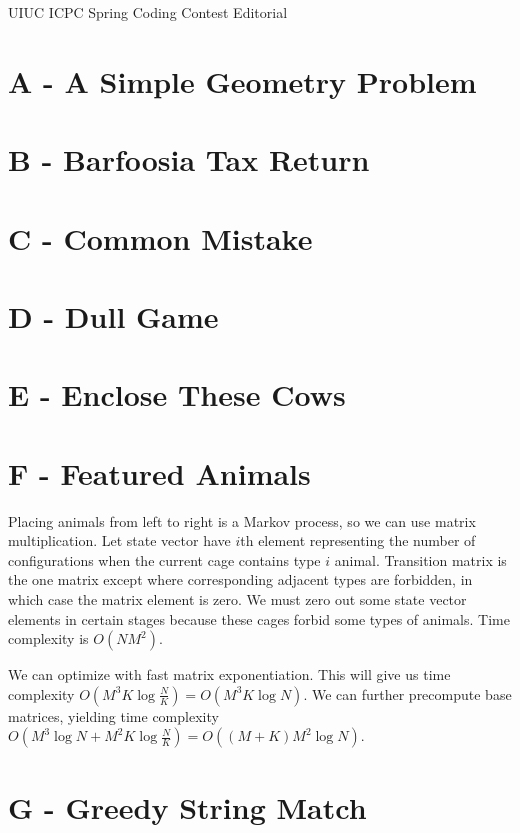\documentclass{article}
\begin{document}
UIUC ICPC Spring Coding Contest Editorial

\section{A - A Simple Geometry Problem}



\section{B - Barfoosia Tax Return}



\section{C - Common Mistake}



\section{D - Dull Game}



\section{E - Enclose These Cows}



\section{F - Featured Animals}

Placing animals from left to right is a Markov process, so we can use matrix multiplication. Let state vector have $i$th element representing the number of configurations when the current cage contains type $i$ animal. Transition matrix is the one matrix except where corresponding adjacent types are forbidden, in which case the matrix element is zero. We must zero out some state vector elements in certain stages because these cages forbid some types of animals. Time complexity is $O(N M^2)$. 

We can optimize with fast matrix exponentiation. This will give us time complexity $O(M^3 K \log{\frac{N}{K}}) = O(M^3 K \log{N})$. We can further precompute base matrices, yielding time complexity $O(M^3 \log{N} + M^2 K \log{\frac{N}{K}}) = O((M+K) M^2 \log{N})$. 

\section{G - Greedy String Match}
\end{document}
